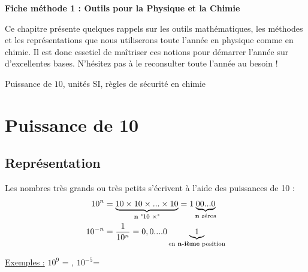 \newpage

\renewcommand{\thesubsection}{\textcolor{red}{\Roman{section}.\arabic{subsection}}}
\renewcommand{\thesubsubsection}{\textcolor{red}{\Roman{section}.\arabic{subsection}.\alph{subsubsection}}}

\setcounter{section}{0}
\sndEnTeteMethodoUn

\begin{center}
\begin{mdframed}[style=titr, leftmargin=60pt, rightmargin=60pt, innertopmargin=7pt, innerbottommargin=7pt, innerrightmargin=8pt, innerleftmargin=8pt]

\begin{center}
\large{\textbf{Fiche méthode 1 : Outils pour la Physique et la Chimie}}
\end{center}

\end{mdframed}
\end{center}
Ce chapitre présente quelques rappels sur les outils mathématiques, les méthodes et les représentations que nous utiliserons toute l'année en physique comme en chimie. Il est donc essetiel de maîtriser ces notions pour démarrer l'année sur d'excellentes bases. N'hésitez pas à le reconsulter toute l'année au besoin !

\begin{tcolorbox}[colback=blue!5!white,colframe=blue!75!black,title=Mots clés du chapitre :]
Puissance de $10$, unités SI, règles de sécurité en chimie
\end{tcolorbox}

\section{Puissance de 10}
\subsection{Représentation}
Les nombres très grands ou très petits s'écrivent à l'aide des puissances de 10 :
\begin{align*}
    10^n &= \underbrace{10\times10\times ... \times 10}_{\text{\textbf{n} "10 $\times$"}} = 1\underbrace{00...0}_{\text{\textbf{n} zéros}} \\
    10^{-n} &= \frac{1}{10^n} = 0,0....0\underbrace{1}_{\text{en \textbf{n-ième} position}}
\end{align*}

\underline{Exemples :} $10^9$ = ,    $10^{-5}$=\\

